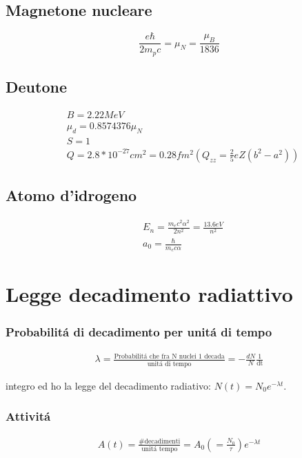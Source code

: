 \documentclass[main.tex]{subfiles}
\begin{document}
 \section{Magnetone nucleare}
 
 \begin{equation*}
  \frac{e\hbar}{2m_pc}=\mu_N=\frac{\mu_B}{1836}
 \end{equation*}
 
 \section{Deutone}
 
\begin{align*}
&B=2.22 MeV\\
&\mu_d=0.8574376\mu_N\\
&S=1\\
&Q=2.8*10^{-27}cm^2=0.28fm^2(Q_{zz}=\frac{2}{5}eZ(b^2-a^2))
\end{align*}
 
 \section{Atomo d'idrogeno}
 
 \begin{align*}
&E_n=\frac{m_ec^2\alpha^2}{2n^2}=\frac{13.6eV}{n^2}\\
&a_0=\frac{\hbar}{m_ec\alpha}
 \end{align*}

\chapter{Legge decadimento radiattivo}

\subsection{Probabilit\'a di decadimento per unit\'a di tempo}
\begin{align*}
\lambda=\frac{\text{Probabilit\'a che fra N nuclei 1 decada}}{\text{unit\'a di tempo}}=-\frac{dN}{N}\frac{1}{\text{dt}}
\end{align*}

integro ed ho la legge del decadimento radiativo:
$N(t)=N_0e^{-\lambda t}$.

\subsection{Attivit\'a}
\begin{align*}
A(t)=\frac{\text{\# decadimenti}}{\text{unit\'a tempo}}=A_0(=\frac{N_0}{\tau})e^{-\lambda t}
\end{align*}
\end{document}
